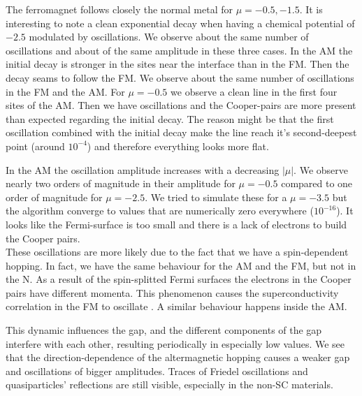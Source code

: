 \documentclass[..\main.tex]{subfile}
\begin{document}
The ferromagnet follows closely the normal metal for $\mu=-0.5,-1.5$. It is interesting to note a clean exponential
decay when having a chemical potential of $-2.5$ modulated by oscillations. We observe about the same number of oscillations and about of
the same amplitude in these three cases. In the AM the initial decay is stronger in the sites near the 
interface than in the FM. Then the decay seams to follow the FM. We observe about the same number of oscillations in the FM and the AM.
For $\mu=-0.5$ we observe a clean line in the first four sites of the AM. Then we have oscillations and the Cooper-pairs are more present
than expected regarding the initial decay. The reason might be that the first oscillation combined with the initial decay make the line
reach it's second-deepest point (around $10^{-4}$) and therefore everything looks more flat.

In the AM the oscillation amplitude increases with a decreasing $|\mu|$.
We observe nearly two orders of magnitude in their amplitude for $\mu=-0.5$ compared to one order of magnitude for $\mu=-2.5$.
We tried to simulate these for a $\mu=-3.5$ but the algorithm  converge to values that are numerically zero everywhere ($10^{-16}$).
It looks like the Fermi-surface is too small and there is a lack of electrons to build the Cooper pairs.\\
 
These oscillations are more likely due to the fact that we have a spin-dependent hopping. In fact, we have the same behaviour for the AM
and the FM, but not in the N. As a result of the spin-splitted Fermi surfaces the electrons in the Cooper pairs have different momenta.
This phenomenon causes the superconductivity correlation in the FM to oscillate \cite{Jong1995}. A similar behaviour happens inside the AM.

This dynamic influences the gap, and the different components of the gap interfere with each other, resulting
periodically in especially low values. We see that the direction-dependence of the altermagnetic hopping causes a weaker gap and 
oscillations of bigger amplitudes. Traces of Friedel oscillations and quasiparticles' reflections are still visible, especially in the non-SC materials.\\
\end{document}
